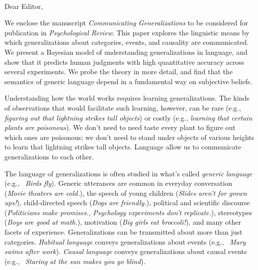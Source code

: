 \documentclass[11pt,letterpaper]{letter} %
\def\opening#1{\thispagestyle{empty}
{\centering\fromaddress \vspace{0.6in} \\ %
\hspace*{\longindentation}\hspace*{\fill}\par} %
\vspace{0.4in} %
\noindent #1 %
}
\begin{document}
\begin{letter}

\opening{Dear Editor,}

We enclose the manuscript \emph{Communicating Generalizations} to be considered for publication in \emph{Psychological Review}. 
This paper explores the linguistic means by which generalizations about categories, events, and causality are communicated.  
We present a Bayesian model of understanding generalizations in language, and show that it predicts human judgments with high quantitative accuracy across several experiments.
We probe the theory in more detail, and find that the semantics of generic language depend in a fundamental way on subjective beliefs. 

Understanding how the world works requires learning generalizations. 
The kinds of observations that would facilitate such learning, however, can be rare (e.g., \emph{figuring out that lightning strikes tall objects}) or costly (e.g., \emph{learning that certain plants are poisonous}).
We don't need to need taste every plant to figure out which ones are poisonous; we don't need to stand under objects of various heights to learn that lightning strikes tall objects.
Language allow us to communicate generalizations to each other.

The language of generalizations is often studied in what's called \emph{generic language} (e.g., ~\emph{Birds fly}).
Generic utterances are common in everyday conversation (\emph{Movie theaters are cold.}), the speech of young children (\emph{Slides aren't for grown ups!}), child-directed speech (\emph{Dogs are friendly.}), political and scientific discourse (\emph{Politicians make promises.}, \emph{Psychology experiments don't replicate.}), stereotypes (\emph{Boys are good at math.}), motivation (\emph{Big girls eat broccoli!}), and many other facets of experience.
Generalizations can be transmitted about more than just categories.
\emph{Habitual language} conveys generalizations about events (e.g., ~\emph{Mary swims after work}).
\emph{Causal language} conveys generalizations about causal events (e.g., ~\emph{Staring at the sun makes you go blind}).


\end{letter}
\end{document}
